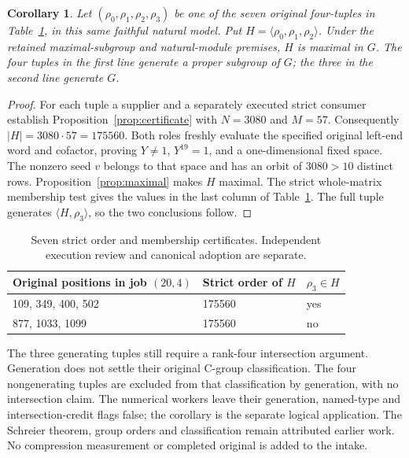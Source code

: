 \documentclass[11pt]{article}
\newtheorem{corollary}[proposition]{Corollary}
\newcommand{\application}{\marginpar{\scriptsize\textsf{Application here}}}
\begin{document}
\begin{corollary}\label{cor:application}\application
Let $(\rho_0,\rho_1,\rho_2,\rho_3)$ be one of the seven original
four-tuples in Table~\ref{tab:seven}, in this same faithful natural model.
Put $H=\langle\rho_0,\rho_1,\rho_2\rangle$.
Under the retained maximal-subgroup and natural-module premises,
$H$ is maximal in $G$. The four tuples in the first line generate a
proper subgroup of $G$; the three in the second line generate $G$.
\end{corollary}

\begin{proof}
For each tuple a supplier and a separately executed strict consumer
establish Proposition~\ref{prop:certificate} with $N=3080$ and $M=57$.
Consequently $|H|=3080\cdot57=175560$.
Both roles freshly evaluate the specified original left-end word and
cofactor, proving $Y\ne1$, $Y^{19}=1$, and a one-dimensional fixed space.
The nonzero seed $v$ belongs to that space and has an orbit of
$3080>10$ distinct rows. Proposition~\ref{prop:maximal} makes $H$ maximal.
The strict whole-matrix membership test gives the values in the last
column of Table~\ref{tab:seven}. The full tuple generates
$\langle H,\rho_3\rangle$, so the two conclusions follow.
\end{proof}

\begin{table}[h]
\centering
\begin{tabular}{lll}
\toprule
Original positions in job $(20,4)$ & Strict order of $H$ & $\rho_3\in H$\\
\midrule
109, 349, 400, 502 & 175560 & yes\\
877, 1033, 1099    & 175560 & no\\
\bottomrule
\end{tabular}
\caption{Seven strict order and membership certificates.
Independent execution review and canonical adoption are separate.}
\label{tab:seven}
\end{table}

The three generating tuples still require a rank-four intersection
argument. Generation does not settle their original C-group
classification. The four nongenerating tuples are excluded from that
classification by generation, with no intersection claim.
The numerical workers leave their generation, named-type and
intersection-credit flags false; the corollary is the separate logical
application. The Schreier theorem, group orders and classification
remain attributed earlier work. No compression measurement or completed
original is added to the intake.
\end{document}
